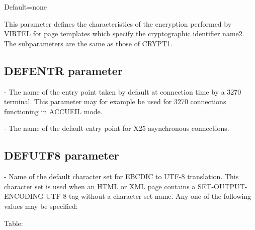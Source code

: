 \documentclass[letterpaper,10pt,english]{sphinxmanual}
\begin{document}
Default=none

This parameter defines the characteristics of the encryption performed by VIRTEL for page templates which specify the cryptographic identifier name2. The subparameters are the same as those of CRYPT1.


\subsection{DEFENTR parameter}
\label{\detokenize{Installation_Guide:defentr-parameter}}\label{\detokenize{Installation_Guide:index-50}}
\begin{sphinxVerbatim}[commandchars=\\\{\}]
 
\end{sphinxVerbatim}

 - The name of the entry point taken by default at connection time by a 3270 terminal. This parameter may for example be used for 3270 connections functioning in ACCUEIL mode.

 - The name of the default entry point for X25 asynchronous connections.


\subsection{DEFUTF8 parameter}
\label{\detokenize{Installation_Guide:index-51}}\label{\detokenize{Installation_Guide:defutf8-parameter}}
\begin{sphinxVerbatim}[commandchars=\\\{\}]
 
\end{sphinxVerbatim}

 - Name of the default character set for EBCDIC to UTF-8 translation. This character set is used when an HTML or XML page contains a SET-OUTPUT-ENCODING-UTF-8 tag without a character set name. Any one of the following values may be specified:

Table:
\end{document}
